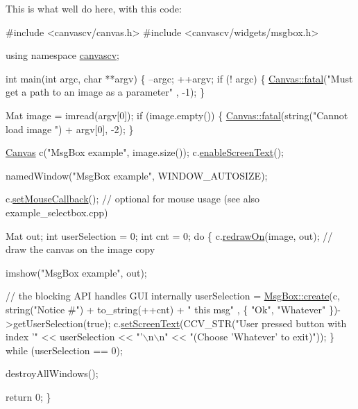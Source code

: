 This is what we\textquotesingle{}ll do here, with this code\+: 
\begin{DoxyCode}
\textcolor{preprocessor}{#include <canvascv/canvas.h>}
\textcolor{preprocessor}{#include <canvascv/widgets/msgbox.h>}

\textcolor{keyword}{using namespace }\hyperlink{namespacecanvascv}{canvascv};

\textcolor{keywordtype}{int} main(\textcolor{keywordtype}{int} argc, \textcolor{keywordtype}{char} **argv)
\{
    --argc;
    ++argv;
    \textcolor{keywordflow}{if} (! argc)
    \{
        \hyperlink{classcanvascv_1_1Canvas_add93c0d5cc1e9b49f97510952a8a1961}{Canvas::fatal}(\textcolor{stringliteral}{"Must get a path to an image as a parameter"} , -1);
    \}

    Mat image = imread(argv[0]);
    \textcolor{keywordflow}{if} (image.empty())
    \{
        \hyperlink{classcanvascv_1_1Canvas_add93c0d5cc1e9b49f97510952a8a1961}{Canvas::fatal}(\textcolor{keywordtype}{string}(\textcolor{stringliteral}{"Cannot load image "}) + argv[0], -2);
    \}

    \hyperlink{classcanvascv_1_1Canvas}{Canvas} c(\textcolor{stringliteral}{"MsgBox example"}, image.size());
    c.\hyperlink{classcanvascv_1_1Canvas_ae68d3277e738d349232400b38f0e5f9e}{enableScreenText}();

    namedWindow(\textcolor{stringliteral}{"MsgBox example"}, WINDOW\_AUTOSIZE);

    c.\hyperlink{classcanvascv_1_1Canvas_acf6e5d4b40aec610b0dc8c4f6bf93ac1}{setMouseCallback}(); \textcolor{comment}{// optional for mouse usage (see also example\_selectbox.cpp)}

    Mat out;
    \textcolor{keywordtype}{int} userSelection = 0;
    \textcolor{keywordtype}{int} cnt = 0;
    \textcolor{keywordflow}{do}
    \{
        c.\hyperlink{classcanvascv_1_1Canvas_a018c66e277de7904b8146ea3f3feebdd}{redrawOn}(image, out);  \textcolor{comment}{// draw the canvas on the image copy}

        imshow(\textcolor{stringliteral}{"MsgBox example"}, out);

        \textcolor{comment}{// the blocking API handles GUI internally}
        userSelection = \hyperlink{classcanvascv_1_1MsgBox_a3bf0019e83e367e415da29286db2c5d0}{MsgBox::create}(c, \textcolor{keywordtype}{string}(\textcolor{stringliteral}{"Notice #"}) + to\_string(++cnt) + \textcolor{stringliteral}{" this msg"}
      , \{
                                           \textcolor{stringliteral}{"Ok"}, \textcolor{stringliteral}{"Whatever"}
                                       \})->getUserSelection(\textcolor{keyword}{true});
        c.\hyperlink{classcanvascv_1_1Canvas_aaedea276b82a8a4cfc0895ae81113cfd}{setScreenText}(CCV\_STR(\textcolor{stringliteral}{"User pressed button with index '"} << userSelection << \textcolor{stringliteral}{"'\(\backslash\)n\(\backslash\)n"}
       <<
                                \textcolor{stringliteral}{"(Choose 'Whatever' to exit)"}));
    \} \textcolor{keywordflow}{while} (userSelection == 0);

    destroyAllWindows();

    \textcolor{keywordflow}{return} 0;
\}
\end{DoxyCode}
